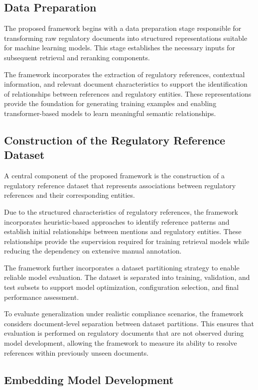 \subsection{Data Preparation}

The proposed framework begins with a data preparation stage responsible for transforming raw regulatory documents into structured representations suitable for machine learning models. This stage establishes the necessary inputs for subsequent retrieval and reranking components.

The framework incorporates the extraction of regulatory references, contextual information, and relevant document characteristics to support the identification of relationships between references and regulatory entities. These representations provide the foundation for generating training examples and enabling transformer-based models to learn meaningful semantic relationships.

\subsection{Construction of the Regulatory Reference Dataset}

A central component of the proposed framework is the construction of a regulatory reference dataset that represents associations between regulatory references and their corresponding entities.

Due to the structured characteristics of regulatory references, the framework incorporates heuristic-based approaches to identify reference patterns and establish initial relationships between mentions and regulatory entities. These relationships provide the supervision required for training retrieval models while reducing the dependency on extensive manual annotation.

The framework further incorporates a dataset partitioning strategy to enable reliable model evaluation. The dataset is separated into training, validation, and test subsets to support model optimization, configuration selection, and final performance assessment.

To evaluate generalization under realistic compliance scenarios, the framework considers document-level separation between dataset partitions. This ensures that evaluation is performed on regulatory documents that are not observed during model development, allowing the framework to measure its ability to resolve references within previously unseen documents.

\subsection{Embedding Model Development}

